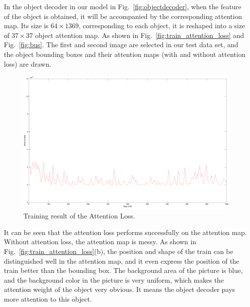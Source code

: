 In the object decoder in our model in Fig.~\ref{fig:objectdecoder}, when the feature of the object is obtained, it will be accompanied by the corresponding attention map. Its size is $ 64\times1369 $, corresponding to each object, it is reshaped into a size of $ 37\times37 $ object attention map. As shown in Fig.~\ref{fig:train_attention_loss} and Fig.~\ref{fig:bus}. The first and second image are selected in our test data set, and the object bounding boxes and their attention maps (with and without attention loss) are drawn.

\begin{figure}[H]
	\centering
	\includegraphics[width=0.7\linewidth]{figures/result/attention_loss}
	\caption[Training result of the Attention Loss]{Training result of the Attention Loss.}
	\label{fig:attention_loss_result}
\end{figure}

It can be seen that the attention loss performs successfully on the attention map. Without attention loss, the attention map is messy. As shown in Fig.~\ref{fig:train_attention_loss}(b), the position and shape of the train can be distinguished well in the attention map, and it even express the position of the train better than the bounding box. The background area of the picture is blue, and the background color in the picture is very uniform, which makes the attention weight of the object very obvious. It means the object decoder pays more attention to this object.

